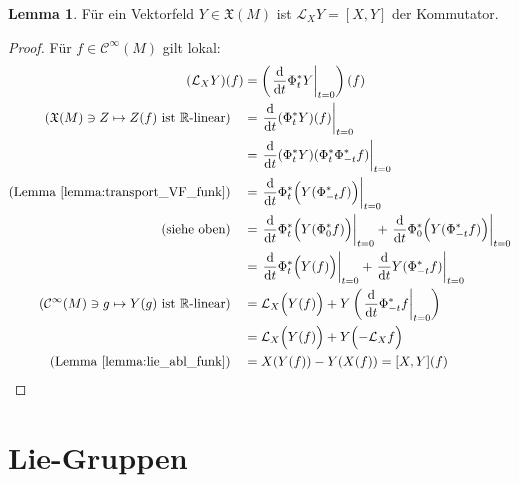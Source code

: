 \documentclass[a4paper]{scrreprt}
\numberwithin{equation}{chapter}
\newcommand{\D}{\mathrm{d}}
\newcommand{\sC}{\mathcal{C}^{\infty}}
\theoremstyle{definition}
\newtheorem{lemma}[defn]{Lemma}
\begin{document}
\begin{lemma}
	Für ein Vektorfeld $Y \in \mathfrak X(M)$ ist $\mathcal L_X Y = [X,Y]$ der Kommutator.

	\begin{proof}
		Für $f\in \sC(M)$ gilt lokal:
		\begingroup
		\allowdisplaybreaks
		\begin{align*}
			(\mathcal L_X Y)(f) &= \left(\left.\frac{\D}{\D t}\Phi_t^* Y\right|_{t=0}\right)(f)\\
			\text{($\mathfrak X(M) \ni Z \mapsto Z(f)$ ist $\mathbb R$-linear)} \quad &= \left.\frac{\D}{\D t}(\Phi_t^* Y)(f)\right|_{t=0}\\
			&= \left.\frac{\D}{\D t}(\Phi_t^* Y)(\Phi_t^* \Phi_{-t}^*f)\right|_{t=0}\\
			\text{(Lemma \ref{lemma:transport_VF_funk})} \quad &= \left.\frac{\D}{\D t}\Phi_t^* \Big(Y(\Phi_{-t}^*f)\Big) \right|_{t=0}\\
			\text{(siehe oben)} \quad &= \left.\frac{\D}{\D t}\Phi_t^* \Big(Y(\Phi_0^*f)\Big) \right|_{t=0} + \left.\frac{\D}{\D t}\Phi_0^* \Big(Y(\Phi_{-t}^*f)\Big) \right|_{t=0}\\
			&= \left.\frac{\D}{\D t}\Phi_t^* \Big(Y(f)\Big) \right|_{t=0} + \left.\frac{\D}{\D t} Y(\Phi_{-t}^*f) \right|_{t=0}\\
			\text{($\sC(M) \ni g \mapsto Y(g)$ ist $\mathbb R$-linear)} \quad &= \mathcal L_X \Big(Y(f)\Big) + Y\left( \left.\frac{\D}{\D t} \Phi_{-t}^*f \right|_{t=0} \right)\\
			&= \mathcal L_X \Big(Y(f)\Big) + Y\Big({-}\mathcal L_{X} f\Big)\\
			\text{(Lemma \ref{lemma:lie_abl_funk})} \quad &= X(Y(f)) - Y(X(f)) = [X,Y](f) \qedhere
		\end{align*}%
		\endgroup
	\end{proof}
\end{lemma}


\chapter{Lie-Gruppen}
\end{document}
